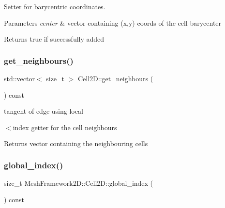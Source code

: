 Setter for barycentric coordinates. 


\begin{DoxyParams}{Parameters}
{\em center} & vector containing (x,y) coords of the cell barycenter\\
\hline
\end{DoxyParams}
\begin{DoxyReturn}{Returns}
true if successfully added 
\end{DoxyReturn}
\mbox{\label{classMeshFramework2D_1_1Cell2D_a8f31d078c59aa8cbe397fbe789500835}} 
\subsubsection{\texorpdfstring{get\+\_\+neighbours()}{get\_neighbours()}}
{\footnotesize\ttfamily std\+::vector$<$ size\+\_\+t $>$ Cell2\+D\+::get\+\_\+neighbours (\begin{DoxyParamCaption}{ }\end{DoxyParamCaption}) const}



tangent of edge using local 

$<$index getter for the cell neighbours

\begin{DoxyReturn}{Returns}
vector containing the neighbouring cells 
\end{DoxyReturn}
\mbox{\label{classMeshFramework2D_1_1Cell2D_a153ec3d2c9b22dbfd0cf68419647a387}} 
\subsubsection{\texorpdfstring{global\+\_\+index()}{global\_index()}}
{\footnotesize\ttfamily size\+\_\+t Mesh\+Framework2\+D\+::\+Cell2\+D\+::global\+\_\+index (\begin{DoxyParamCaption}{ }\end{DoxyParamCaption}) const\hspace{0.3cm}{\ttfamily [inline]}}



